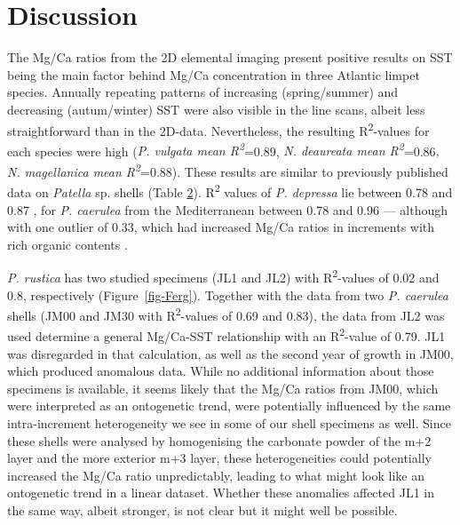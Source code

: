 \documentclass[
  authoryear,
  preprint,
  3p]{elsarticle}
\begin{document}
\section{Discussion}\label{Discussion}

The Mg/Ca ratios from the 2D elemental imaging present positive results
on SST being the main factor behind Mg/Ca concentration in three
Atlantic limpet species. Annually repeating patterns of increasing
(spring/summer) and decreasing (autum/winter) SST were also visible in
the line scans, albeit less straightforward than in the 2D-data.
Nevertheless, the resulting R\textsuperscript{2}-values for each species
were high (\emph{P. vulgata mean R\textsuperscript{2}}=0.89, \emph{N.
deaureata mean R\textsuperscript{2}}=0.86\emph{, N. magellanica mean
R\textsuperscript{2}}=0.88). These results are similar to previously
published data on \emph{Patella} sp. shells (Table
\hyperref[Table_2]{2}). R\textsuperscript{2} values of \emph{P.
depressa} lie between 0.78 and 0.87 \citep{Garcia-Escarzaga2021-ij}, for
\emph{P. caerulea} from the Mediterranean between 0.78 and 0.96 ---
although with one outlier of 0.33, which had increased Mg/Ca ratios in
increments with rich organic contents \citep{Hausmann2019-fi}.

\emph{P. rustica} has two studied specimens (JL1 and JL2) with
R\textsuperscript{2}-values of 0.02 and 0.8, respectively
\citep{Ferguson2011-zl} (Figure~\ref{fig-Ferg}). Together with the data
from two \emph{P. caerulea} shells (JM00 and JM30 with
R\textsuperscript{2}-values of 0.69 and 0.83), the data from JL2 was
used determine a general Mg/Ca-SST relationship with an
R\textsuperscript{2}-value of 0.79. JL1 was disregarded in that
calculation, as well as the second year of growth in JM00, which
produced anomalous data. While no additional information about those
specimens is available, it seems likely that the Mg/Ca ratios from JM00,
which were interpreted as an ontogenetic trend, were potentially
influenced by the same intra-increment heterogeneity we see in some of
our shell specimens as well. Since these shells were analysed by
homogenising the carbonate powder of the m+2 layer and the more exterior
m+3 layer, these heterogeneities could potentially increased the Mg/Ca
ratio unpredictably, leading to what might look like an ontogenetic
trend in a linear dataset. Whether these anomalies affected JL1 in the
same way, albeit stronger, is not clear but it might well be possible.
\end{document}
